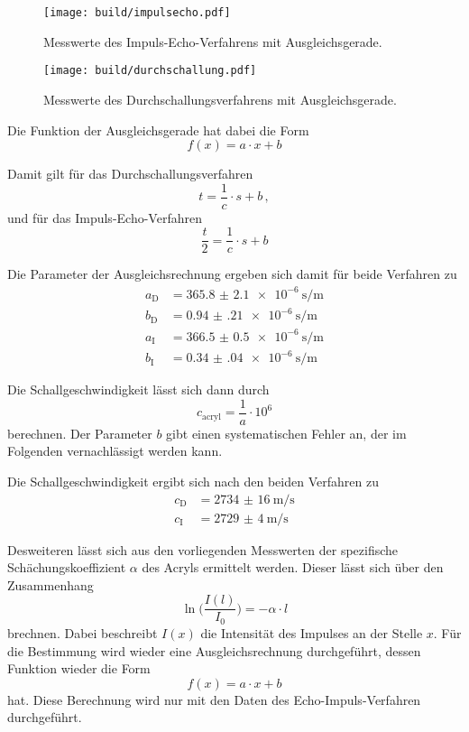 \begin{figure}
    \centering
    \texttt{[image: build/impulsecho.pdf]}
    \caption{Messwerte des Impuls-Echo-Verfahrens mit Ausgleichsgerade.}
    \label{fig:imp}
\end{figure}

\begin{figure}
    \centering
    \texttt{[image: build/durchschallung.pdf]}
    \caption{Messwerte des Durchschallungsverfahrens mit Ausgleichsgerade.}
    \label{fig:durch}
\end{figure}

Die Funktion der Ausgleichsgerade hat dabei die Form 
\begin{equation}
    f(x) = a\cdot x + b 
\end{equation}

Damit gilt für das Durchschallungsverfahren 
\begin{equation}
    t = \frac{1}{c}\cdot s + b\,,
\end{equation}
und für das Impuls-Echo-Verfahren
\begin{equation}
    \frac{t}{2} = \frac{1}{c}\cdot s + b
\end{equation}

Die Parameter der Ausgleichsrechnung ergeben sich damit für beide Verfahren zu 
\begin{align}
    a_\text{D} &= \SI{365.8(21)e-6}{\s\per\m} \\
    b_\text{D} &= \SI{0.94(21)e-6}{\s\per\m} \\
    a_\text{I} &= \SI{366.5(05)e-6}{\s\per\m} \\
    b_\text{I} &= \SI{0.34(04)e-6}{\s\per\m} 
\end{align}

Die Schallgeschwindigkeit lässt sich dann durch 
\begin{equation}
    c_\text{acryl} = \frac{1}{a}\cdot 10^6
\end{equation}
berechnen. Der Parameter $b$ gibt einen systematischen Fehler an, der im Folgenden vernachlässigt werden kann. 

Die Schallgeschwindigkeit ergibt sich nach den beiden Verfahren zu 
\begin{align}
    c_\text{D} &= \SI{2734(16)}{\m\per\s} \\
    c_\text{I} &= \SI{2729(4)}{\m\per\s}
\end{align}

Desweiteren lässt sich aus den vorliegenden Messwerten der spezifische Schächungskoeffizient $\alpha$ des Acryls ermittelt 
werden. Dieser lässt sich über den Zusammenhang 
\begin{equation}
    \ln{\bigl(\frac{I(l)}{I_0}\bigr)} = - \alpha \cdot l
\end{equation}
brechnen. Dabei beschreibt $I(x)$ die Intensität des Impulses an der Stelle $x$. Für die Bestimmung wird wieder eine Ausgleichsrechnung
durchgeführt, dessen Funktion wieder die Form 
\begin{equation}
    f(x) = a\cdot x + b 
\end{equation}  
hat. Diese Berechnung wird nur mit den Daten des Echo-Impuls-Verfahren durchgeführt.

